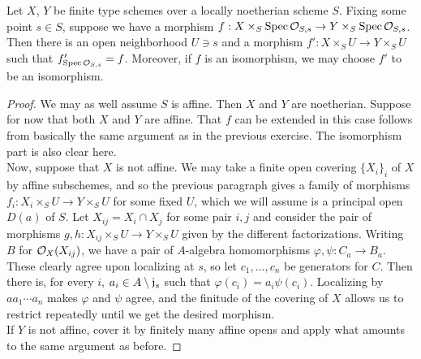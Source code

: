 \begin{exer}
	Let $X$, $Y$ be finite type schemes over a locally noetherian scheme
	$S$. Fixing some point $s \in S$, suppose we have a morphism
	$f: X \times_S \operatorname{Spec} \mathcal{O}_{S,s} \to Y \times_S \operatorname{Spec} \mathcal{O}_{S,s}$. Then
	there is an open neighborhood $U \ni s$ and a morphism
	$f': X \times_S U \to Y \times_S U$ such that $f'_{\operatorname{Spec} \mathcal{O}_{S,s}}=f$.
	Moreover, if $f$ is an isomorphism, we may choose $f'$ to be an
	isomorphism.
\end{exer}
\begin{proof}
	We may as well assume $S$ is affine. Then $X$ and $Y$ are noetherian.
	Suppose for now that both $X$ and $Y$ are affine. That $f$ can be
	extended in this case follows from basically the same argument as in the
	previous exercise. The isomorphism part is also clear here.\\

	Now, suppose that $X$ is not affine. We may take a finite open covering
	$\{X_i\}_i$ of $X$ by affine subschemes, and so the previous paragraph
	gives a family of morphisms $f_i: X_i \times_S U \to Y \times_S U$ for
	some fixed $U$, which we will assume is a principal open $D(a)$ of $S$.
	Let $X_{ij} = X_i \cap X_j$ for some pair $i,j$ and consider the pair of
	morphisms $g,h: X_{ij} \times_S U \to Y \times_S U$ given by the
	different factorizations. Writing $B$ for $\mathcal{O}_X(X_{ij})$, we have a
	pair of $A$-algebra homomorphisms $\varphi,\psi: C_a \to B_a$. These
	clearly agree upon localizing at $s$, so let $c_1,\ldots,c_n$ be
	generators for $C$. Then there is, for every $i$, $a_i \in A \setminus
	\mathfrak{j}_s$ such that $\varphi(c_i) = a_i\psi(c_i)$. Localizing by
	$aa_1\cdots a_n$ makes $\varphi$ and $\psi$ agree, and the finitude
	of the covering of $X$ allows us to restrict repeatedly until we get the
	desired morphism.\\

	If $Y$ is not affine, cover it by finitely many affine opens and apply
	what amounts to the same argument as before.
\end{proof}
